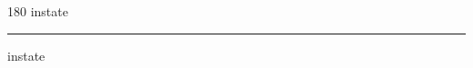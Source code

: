 
\begin{frame}
\begin{center}
\begin{turn}{180}
{\fontsize{2.5cm}{1em}\selectfont instate}
\end{turn}
\vspace{1em}\par  
\hrule
\vspace{1em}\par  
{\fontsize{2.5cm}{1em}\selectfont instate}
\end{center}
\end{frame}
